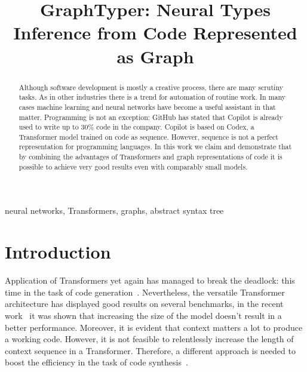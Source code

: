 \documentclass[conference]{IEEEtran}
\begin{document}
\author{
     \and
    \and
}

\title{GraphTyper: Neural Types Inference from Code Represented as Graph}

\begin{abstract}
    Although software development is mostly a creative process, there are many scrutiny tasks.
    As in other industries there is a trend for automation of routine work.
    In many cases machine learning and neural networks have become a useful assistant in that matter.
    Programming is not an exception: GitHub has stated that Copilot is already used to write up to 30\% code in the company.
    Copilot is based on Codex, a Transformer model trained on code as sequence.
    However, sequence is not a perfect representation for programming languages.
    In this work we claim and demonstrate that by combining the advantages of Transformers
    and graph representations of code it is possible to achieve very good results even with comparably small models.
\end{abstract}

\begin{IEEEkeywords}
    neural networks, Transformers, graphs, abstract syntax tree
\end{IEEEkeywords}

\maketitle

\section{Introduction}\label{sec:introduction}

Application of Transformers yet again has managed to break the deadlock: this time in the task of code generation~\cite{hendrycks_measuring_2021,chen_evaluating_2021,li_competition-level_nodate,nijkamp_conversational_2022}.
Nevertheless, the versatile Transformer architecture has displayed good results on several benchmarks,
in the recent work~\cite{xu_systematic_2022} it was shown that increasing the size of the model doesn't result in a better performance.
Moreover, it is evident that context matters a lot to produce a working code.
However, it is not feasible to relentlessly increase the length of context sequence in a Transformer.
Therefore, a different approach is needed to boost the efficiency in the task of code synthesis~\cite{arutyunov_big_2022}.
\end{document}
